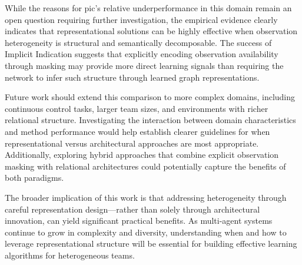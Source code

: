 \documentclass[conference]{IEEEtran}
\begin{document}
While the reasons for \gls{pic}'s relative underperformance in this 
domain remain an open question requiring further investigation, 
the empirical evidence clearly indicates that representational 
solutions can be highly effective when observation heterogeneity 
is structural and semantically decomposable. 
The success of Implicit Indication suggests that explicitly 
encoding observation availability through masking may provide 
more direct learning signals than requiring the network to 
infer such structure through learned graph representations.

Future work should extend this comparison to more complex domains, 
including continuous control tasks, larger team sizes, and 
environments with richer relational structure. Investigating the 
interaction between domain characteristics and method performance 
would help establish clearer guidelines for when representational 
versus architectural approaches are most appropriate. Additionally, 
exploring hybrid approaches that combine explicit observation masking 
with relational architectures could potentially capture the benefits 
of both paradigms.

The broader implication of this work is that addressing heterogeneity through 
careful representation design—rather than solely through architectural innovation, 
can yield significant practical benefits. As multi-agent systems continue to 
grow in complexity and diversity, understanding when and how to leverage 
representational structure will be essential for building effective learning 
algorithms for heterogeneous teams.


\end{document}
